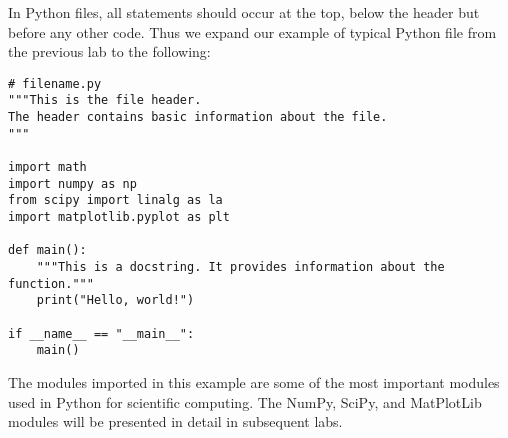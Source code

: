 In Python files, all  statements should occur at the top, below the header but before any other code.
Thus we expand our example of typical Python file from the previous lab to the following:

\begin{lstlisting}
# filename.py
"""This is the file header.
The header contains basic information about the file.
"""

import math
import numpy as np
from scipy import linalg as la
import matplotlib.pyplot as plt

def main():
    """This is a docstring. It provides information about the function."""
    print("Hello, world!")

if __name__ == "__main__":
    main()
\end{lstlisting}

The modules imported in this example are some of the most important modules used in Python for scientific computing.
The NumPy, SciPy, and MatPlotLib modules will be presented in detail in subsequent labs.

